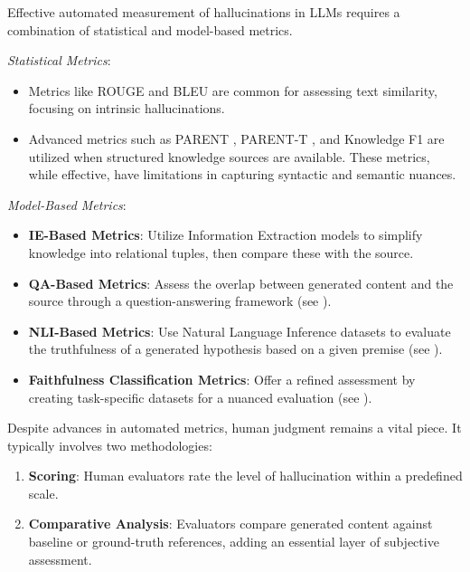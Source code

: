 \documentclass[conference]{IEEEtran}
\begin{document}
Effective automated measurement of hallucinations in LLMs requires a combination of statistical and model-based metrics.

\emph{Statistical Metrics}:
\begin{itemize}
    \item Metrics like ROUGE \cite{lin-2004-rouge} and BLEU \cite{papineni-etal-2002-bleu} are common for assessing text similarity, focusing on intrinsic hallucinations.
    \item Advanced metrics such as PARENT \cite{dhingra-etal-2019-PARENT}, PARENT-T \cite{wang-etal-2020-PARENT-T}, and Knowledge F1 \cite{Song_Zhang_Hu_Liu_2020} are utilized when structured knowledge sources are available. These metrics, while effective, have limitations in capturing syntactic and semantic nuances.
\end{itemize}

\emph{Model-Based Metrics}:
\begin{itemize}
    \item \textbf{IE-Based Metrics}: Utilize Information Extraction models to simplify knowledge into relational tuples, then compare these with the source.
    \item \textbf{QA-Based Metrics}: Assess the overlap between generated content and the source through a question-answering framework (see \cite{honovich-etal-2021-q2}).
    \item \textbf{NLI-Based Metrics}: Use Natural Language Inference datasets to evaluate the truthfulness of a generated hypothesis based on a given premise (see \cite{dziri-etal-2022-evaluating}).
    \item \textbf{Faithfulness Classification Metrics}: Offer a refined assessment by creating task-specific datasets for a nuanced evaluation (see \cite{Santhanam2021RomeWB}).
\end{itemize}

Despite advances in automated metrics, human judgment remains a vital piece. It typically involves two methodologies:

\begin{enumerate}
    \item \textbf{Scoring}: Human evaluators rate the level of hallucination within a predefined scale.
    \item \textbf{Comparative Analysis}: Evaluators compare generated content against baseline or ground-truth references, adding an essential layer of subjective assessment.
\end{enumerate}
\end{document}
